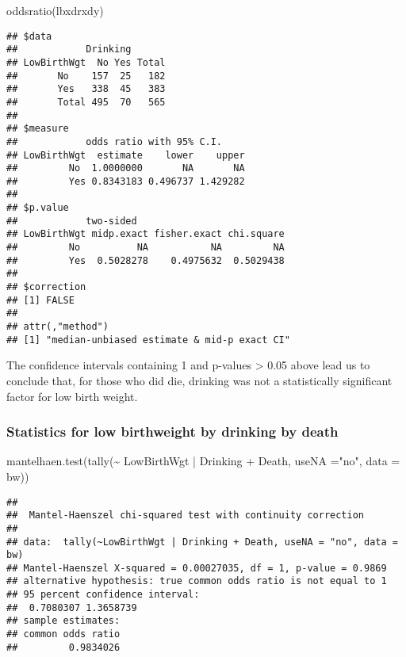 \documentclass[
]{article}
\newenvironment{Shaded}{\begin{snugshade}}{\end{snugshade}}
\newcommand{\AttributeTok}[1]{\textcolor[rgb]{0.77,0.63,0.00}{#1}}
\newcommand{\FunctionTok}[1]{\textcolor[rgb]{0.00,0.00,0.00}{#1}}
\newcommand{\NormalTok}[1]{#1}
\newcommand{\SpecialCharTok}[1]{\textcolor[rgb]{0.00,0.00,0.00}{#1}}
\newcommand{\StringTok}[1]{\textcolor[rgb]{0.31,0.60,0.02}{#1}}
\begin{document}
\begin{Shaded}
\begin{Highlighting}[]
\FunctionTok{oddsratio}\NormalTok{(lbxdrxdy)}
\end{Highlighting}
\end{Shaded}

\begin{verbatim}
## $data
##            Drinking
## LowBirthWgt  No Yes Total
##       No    157  25   182
##       Yes   338  45   383
##       Total 495  70   565
## 
## $measure
##            odds ratio with 95% C.I.
## LowBirthWgt  estimate    lower    upper
##         No  1.0000000       NA       NA
##         Yes 0.8343183 0.496737 1.429282
## 
## $p.value
##            two-sided
## LowBirthWgt midp.exact fisher.exact chi.square
##         No          NA           NA         NA
##         Yes  0.5028278    0.4975632  0.5029438
## 
## $correction
## [1] FALSE
## 
## attr(,"method")
## [1] "median-unbiased estimate & mid-p exact CI"
\end{verbatim}

The confidence intervals containing 1 and p-values \textgreater{} 0.05
above lead us to conclude that, for those who did die, drinking was not
a statistically significant factor for low birth weight.

\hypertarget{statistics-for-low-birthweight-by-drinking-by-death}{%
\subsubsection{Statistics for low birthweight by drinking by
death}\label{statistics-for-low-birthweight-by-drinking-by-death}}

\begin{Shaded}
\begin{Highlighting}[]
\FunctionTok{mantelhaen.test}\NormalTok{(}\FunctionTok{tally}\NormalTok{(}\SpecialCharTok{\textasciitilde{}}\NormalTok{ LowBirthWgt }\SpecialCharTok{|}\NormalTok{ Drinking }\SpecialCharTok{+}\NormalTok{ Death, }\AttributeTok{useNA =}\StringTok{"no"}\NormalTok{, }\AttributeTok{data =}\NormalTok{ bw))}
\end{Highlighting}
\end{Shaded}

\begin{verbatim}
## 
##  Mantel-Haenszel chi-squared test with continuity correction
## 
## data:  tally(~LowBirthWgt | Drinking + Death, useNA = "no", data = bw)
## Mantel-Haenszel X-squared = 0.00027035, df = 1, p-value = 0.9869
## alternative hypothesis: true common odds ratio is not equal to 1
## 95 percent confidence interval:
##  0.7080307 1.3658739
## sample estimates:
## common odds ratio 
##         0.9834026
\end{verbatim}
\end{document}
